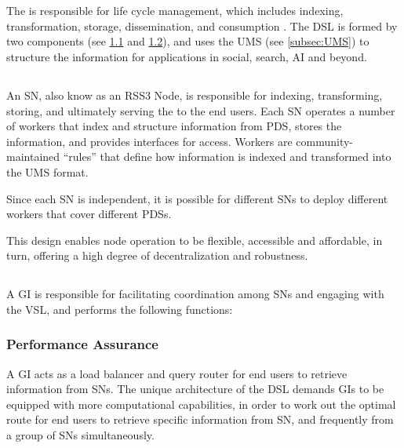 \section{}
\label{sec:DSL}

The  is responsible for  life cycle management, which includes indexing, transformation, storage, dissemination, and consumption \cite{nationalinstituteofstandardsandtechnology2016Information}. The \gls{DSL} is formed by two components (see \cref{subsec:SN} and \cref{subsec:GI}), and uses the \gls{UMS} (see \cref{subsec:UMS}) to structure the information for applications in social, search, AI and beyond.

\subsection{}
\label{subsec:SN}

An \gls{SN}, also know as an RSS3 Node, is responsible for indexing, transforming, storing, and ultimately serving the  to the end users. Each \gls{SN} operates a number of workers that index and structure information from \gls{PDS}, stores the information, and provides interfaces for access. Workers are community-maintained ``rules'' that define how information is indexed and transformed into the \gls{UMS} format. 

Since each \gls{SN} is independent, it is possible for different \glspl{SN} to deploy different workers that cover different \glspl{PDS}.

This design enables node operation to be flexible, accessible and affordable, in turn, offering a high degree of decentralization and robustness.

\subsection{}
\label{subsec:GI}

A \gls{GI} is responsible for facilitating coordination among \glspl{SN} and engaging with the \gls{VSL}, and performs the following functions:

\subsubsection{Performance Assurance} A GI acts as a load balancer and query router for end users to retrieve information from \glspl{SN}. The unique architecture of the \gls{DSL} demands \glspl{GI} to be equipped with more computational capabilities, in order to work out the optimal route for end users to retrieve specific information from \gls{SN}, and frequently from a group of \glspl{SN} simultaneously.

